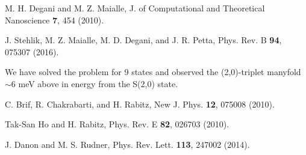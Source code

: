 \documentclass[prb,twocolumn,showpacs,floats]{revtex4}
\begin{document}
\begin{thebibliography}{99}
 M. H. Degani and M. Z. Maialle, J. of
Computational and Theoretical Nanoscience {\bf 7}, 454 (2010).


J. Stehlik, M. Z. Maialle, M. D.  Degani, and J. R. Petta, Phys. Rev. B {\bf 94}, 075307 (2016).

 We have solved the problem for 9 states and observed 
the (2,0)-triplet manyfold $\sim$6 meV above in energy from the S(2,0) state.


 C. Brif, R. Chakrabarti, and H. Rabitz, New J. Phys. {\bf 12}, 075008  (2010).

 Tak-San Ho and H. Rabitz, Phys. Rev. E {\bf 82}, 026703 (2010).

 J. Danon and M. S. Rudner, Phys. Rev. Lett. {\bf 113}, 247002 (2014).




\end{thebibliography}
\end{document}
